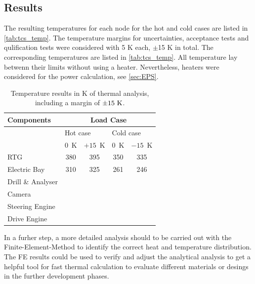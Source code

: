 \subsection{Results}
The resulting temperatures for each node for the hot and cold cases  are listed in \autoref{tab:tcs_temp}.
The temperature margins for uncertainties, acceptance tests and qulification tests were considered with 5 K each, $\pm$15 K in total.
The corresponding temperatures are listed in \autoref{tab:tcs_temp}.
All temperature lay betwenn their limits without using a heater.
Nevertheless, heaters were considered for the power calculation, see \autoref{sec:EPS}.

\begin{table}[htb]
	\centering
	\caption{Temperature results in K of thermal analysis, including a margin of $\pm15\ {\rm K}$.}
	\begin{tabular}{l@{\qquad\qquad}cc@{\qquad}|@{\qquad}cc}
		\hline
		Components & \multicolumn{4}{c}{Load Case}   \\ \hline
		& \multicolumn{2}{l}{Hot case} & \multicolumn{2}{l}{Cold case} \\
		& $0$\ K & $+15$\ K & $0$\ K & $-15$\ K \\ \hline
		RTG  & 380 & 395 & 350 & 335   \\
		Electric Bay & 310 & 325 & 261 & 246  \\
		Drill \& Analyser & & & &  \\
		Camera & & & &  \\
		Steering Engine & & & &  \\
		Drive Engine & & & &  \\   \hline
	\end{tabular}
	\label{tab:tcs_temp}
\end{table}

In a furher step, a more detailed analysis should to be carried out with the Finite-Element-Method to identify the correct heat and temperature distribution.
The FE results could be used to verify and adjust the analytical analysis to get a helpful tool for fast thermal calculation to evaluate different materials or desings in the further development phases.


\cleardoublepage